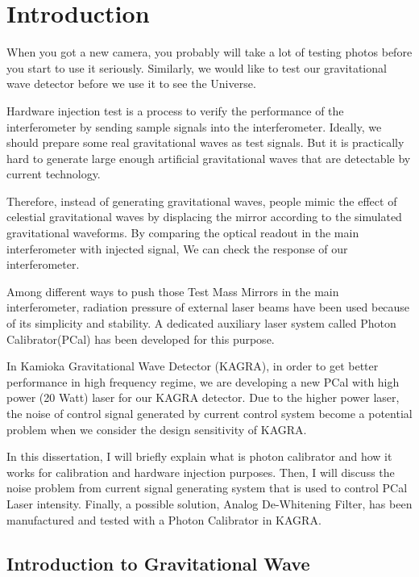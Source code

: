 \chapter{Introduction} 

When you got a new camera, you probably will take a lot of testing photos before you start to use it seriously. Similarly, we would like to test our gravitational wave detector before we use it to see the Universe.

Hardware injection test is a process to verify the performance of the interferometer by sending sample signals into the interferometer\cite{ligo:inj}. Ideally, we should prepare some real gravitational waves as test signals. But it is practically hard to generate large enough artificial gravitational waves that are detectable by current technology. 

Therefore, instead of generating gravitational waves, people mimic the effect of celestial gravitational waves by displacing the mirror according to the simulated gravitational waveforms. By comparing the optical readout in the main interferometer with injected signal, We can check the response of our interferometer. 

Among different ways to push those Test Mass Mirrors in the main interferometer, radiation pressure of external laser beams have been used because of its simplicity and stability. A dedicated auxiliary laser system called Photon Calibrator(PCal) has been developed for this purpose. 

In Kamioka Gravitational Wave Detector (KAGRA), in order to get better performance in high frequency regime, we are developing a new PCal with high power (20 Watt) laser for our KAGRA detector. Due to the higher power laser, the noise of control signal generated by current control system become a potential problem when we consider the design sensitivity of KAGRA.

In this dissertation, I will briefly explain what is photon calibrator and how it works for calibration and hardware injection purposes. Then, I will discuss the noise problem from current signal generating system that is used to control PCal Laser intensity. Finally, a possible solution, Analog De-Whitening Filter, has been manufactured and tested with a Photon Calibrator in KAGRA. 
 

\section{Introduction to Gravitational Wave}
